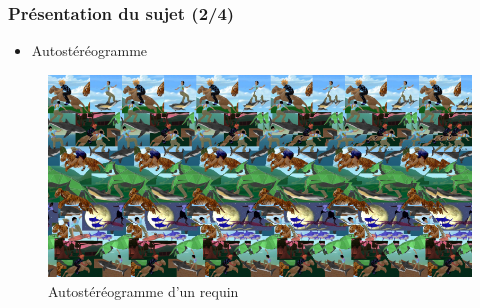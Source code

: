 \documentclass{beamer}
\begin{document}
\begin{frame}

\frametitle{Présentation du sujet (2/4)}

\begin{itemize}[label=$\bullet$]
\item Autostéréogramme
\end{itemize}
\begin{figure}
\centering
\includegraphics[scale=0.4]{autostereog.png} %
\caption{Autostéréogramme d'un requin \footnotemark}
\end{figure}

\end{frame}
\end{document}
